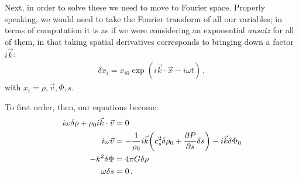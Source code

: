 \documentclass[main.tex]{subfiles}
\begin{document}




Next, in order to solve these we need to move to Fourier space. Properly speaking, we would need to take the Fourier transform of all our variables; in terms of computation it is as if we were considering an exponential \emph{ansatz} for all of them, in that taking spatial derivatives corresponds to bringing down a factor \(i \vec{k}\): 
%
\begin{align}
  \delta x_i = x_{i0} \exp( i \vec{k} \cdot \vec{x} - i \omega t)
\,,
\end{align}
%
with \(x_{i} = \rho, \vec{v}, \Phi , s\). 

To first order, then, our equations become: 
%
\begin{subequations}
\begin{align}
  i \omega \delta \rho + \rho_0 i \vec{k} \cdot \vec{v} &=0  \\
  i \omega \vec{v} &= -\frac{1}{\rho_0 } i \vec{k}
  \qty(c^2_s \delta \rho_0 + \pdv{P}{s} \delta s ) 
  - i \vec{k} \delta \Phi_0 \\
  - k^2 \delta \Phi &= 4 \pi G \delta \rho  \\
  \omega \delta s &= 0
\,.
\end{align}
\end{subequations}
\end{document}
